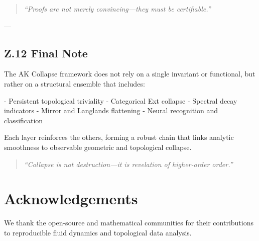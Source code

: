 \documentclass[11pt]{article}
\theoremstyle{definition}
\begin{document}
\begin{quote}
\textit{“Proofs are not merely convincing—they must be certifiable.”}
\end{quote}

---

\subsection*{Z.12 Final Note}

The AK Collapse framework does not rely on a single invariant or functional, but rather on a structural ensemble that includes:

- Persistent topological triviality
- Categorical Ext collapse
- Spectral decay indicators
- Mirror and Langlands flattening
- Neural recognition and classification

Each layer reinforces the others, forming a robust chain that links analytic smoothness to observable geometric and topological collapse.

\begin{quote}
\textit{“Collapse is not destruction—it is revelation of higher-order order.”}
\end{quote}



\section*{Acknowledgements}
We thank the open-source and mathematical communities for their contributions to reproducible fluid dynamics and topological data analysis.
\end{document}
